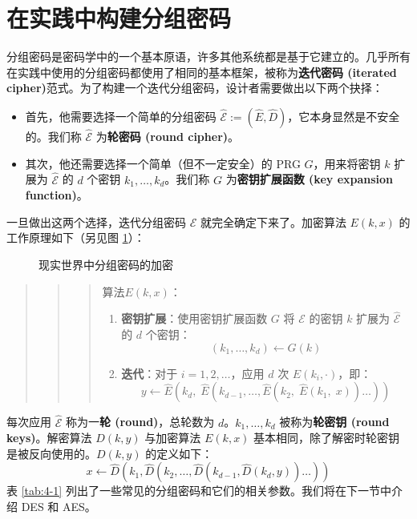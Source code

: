 \section{在实践中构建分组密码}

分组密码是密码学中的一个基本原语，许多其他系统都是基于它建立的。几乎所有在实践中使用的分组密码都使用了相同的基本框架，被称为\textbf{迭代密码 (iterated cipher)}范式。为了构建一个迭代分组密码，设计者需要做出以下两个抉择：
\begin{itemize}
	\item 首先，他需要选择一个简单的分组密码 $\mathcal{\hat E}:=(\hat E,\hat D)$，它本身显然是不安全的。我们称 $\mathcal{\hat E}$ 为\textbf{轮密码 (round cipher)}。
	\item 其次，他还需要选择一个简单（但不一定安全）的 PRG $G$，用来将密钥 $k$ 扩展为 $\mathcal{\hat E}$ 的 $d$ 个密钥 $k_1,\dots,k_d$。我们称 $G$ 为\textbf{密钥扩展函数 (key expansion function)}。
\end{itemize}
一旦做出这两个选择，迭代分组密码 $\mathcal{E}$ 就完全确定下来了。加密算法 $E(k,x)$ 的工作原理如下（另见图 \ref{fig:4-6}）：

\begin{figure}
  \centering
  
  \caption{现实世界中分组密码的加密}
  \label{fig:4-6}
\end{figure}

\begin{quote}
\begin{quote}
\begin{quote}
\begin{tcolorbox}[colframe=black,colback=white,boxrule=0.6pt,arc=0pt]
算法$E(k,x)$：

\vspace{5pt}

\begin{enumerate}
	\item \textbf{密钥扩展}：使用密钥扩展函数 $G$ 将 $\mathcal{E}$ 的密钥 $k$ 扩展为 $\mathcal{\hat E}$ 的 $d$ 个密钥：
	\[(k_1,\dots,k_d)\leftarrow G(k)\]
    \item \textbf{迭代}：对于 $i=1,2,\dots$，应用 $d$ 次 $\hat E(k_i,\cdot)$，即：
    \[y\leftarrow\hat{E}(k_d,\;\hat{E}(k_{d-1},\dots,\hat{E}(k_2,\;\hat{E}(k_1,\;x))\dots))\]
\end{enumerate}
\end{tcolorbox}
\end{quote}
\end{quote}
\end{quote}
每次应用 $\mathcal{\hat E}$ 称为一\textbf{轮 (round)}，总轮数为 $d$。$k_1,\dots,k_d$ 被称为\textbf{轮密钥 (round keys)}。解密算法 $D(k, y)$ 与加密算法 $E(k,x)$ 基本相同，除了解密时轮密钥是被反向使用的。$D(k,y)$ 的定义如下：
\[
x\leftarrow\hat{D}(k_1,\hat{D}(k_2,\dots,\hat{D}(k_{d-1},\hat{D}(k_d,y))\dots))
\]
表 \ref{tab:4-1} 列出了一些常见的分组密码和它们的相关参数。我们将在下一节中介绍 DES 和 AES。

